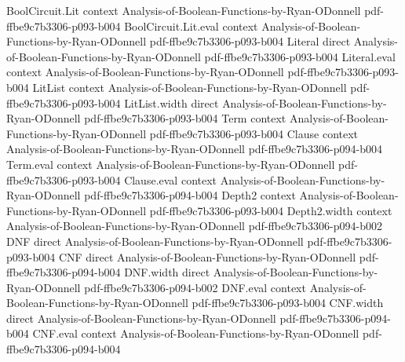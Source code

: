 \begin{lemma}
\leanok
{}
\proofstep
  {BoolCircuit.Lit}
  {context}
  {Analysis-of-Boolean-Functions-by-Ryan-ODonnell}
  {pdf-ffbe9c7b3306-p093-b004}
\proofstep
  {BoolCircuit.Lit.eval}
  {context}
  {Analysis-of-Boolean-Functions-by-Ryan-ODonnell}
  {pdf-ffbe9c7b3306-p093-b004}
\proofstep
  {Literal}
  {direct}
  {Analysis-of-Boolean-Functions-by-Ryan-ODonnell}
  {pdf-ffbe9c7b3306-p093-b004}
\proofstep
  {Literal.eval}
  {context}
  {Analysis-of-Boolean-Functions-by-Ryan-ODonnell}
  {pdf-ffbe9c7b3306-p093-b004}
\proofstep
  {LitList}
  {context}
  {Analysis-of-Boolean-Functions-by-Ryan-ODonnell}
  {pdf-ffbe9c7b3306-p093-b004}
\proofstep
  {LitList.width}
  {direct}
  {Analysis-of-Boolean-Functions-by-Ryan-ODonnell}
  {pdf-ffbe9c7b3306-p093-b004}
\proofstep
  {Term}
  {context}
  {Analysis-of-Boolean-Functions-by-Ryan-ODonnell}
  {pdf-ffbe9c7b3306-p093-b004}
\proofstep
  {Clause}
  {context}
  {Analysis-of-Boolean-Functions-by-Ryan-ODonnell}
  {pdf-ffbe9c7b3306-p094-b004}
\proofstep
  {Term.eval}
  {context}
  {Analysis-of-Boolean-Functions-by-Ryan-ODonnell}
  {pdf-ffbe9c7b3306-p093-b004}
\proofstep
  {Clause.eval}
  {context}
  {Analysis-of-Boolean-Functions-by-Ryan-ODonnell}
  {pdf-ffbe9c7b3306-p094-b004}
\proofstep
  {Depth2}
  {context}
  {Analysis-of-Boolean-Functions-by-Ryan-ODonnell}
  {pdf-ffbe9c7b3306-p093-b004}
\proofstep
  {Depth2.width}
  {context}
  {Analysis-of-Boolean-Functions-by-Ryan-ODonnell}
  {pdf-ffbe9c7b3306-p094-b002}
\proofstep
  {DNF}
  {direct}
  {Analysis-of-Boolean-Functions-by-Ryan-ODonnell}
  {pdf-ffbe9c7b3306-p093-b004}
\proofstep
  {CNF}
  {direct}
  {Analysis-of-Boolean-Functions-by-Ryan-ODonnell}
  {pdf-ffbe9c7b3306-p094-b004}
\proofstep
  {DNF.width}
  {direct}
  {Analysis-of-Boolean-Functions-by-Ryan-ODonnell}
  {pdf-ffbe9c7b3306-p094-b002}
\proofstep
  {DNF.eval}
  {context}
  {Analysis-of-Boolean-Functions-by-Ryan-ODonnell}
  {pdf-ffbe9c7b3306-p093-b004}
\proofstep
  {CNF.width}
  {direct}
  {Analysis-of-Boolean-Functions-by-Ryan-ODonnell}
  {pdf-ffbe9c7b3306-p094-b004}
\proofstep
  {CNF.eval}
  {context}
  {Analysis-of-Boolean-Functions-by-Ryan-ODonnell}
  {pdf-ffbe9c7b3306-p094-b004}
\proofstep

\end{lemma}
